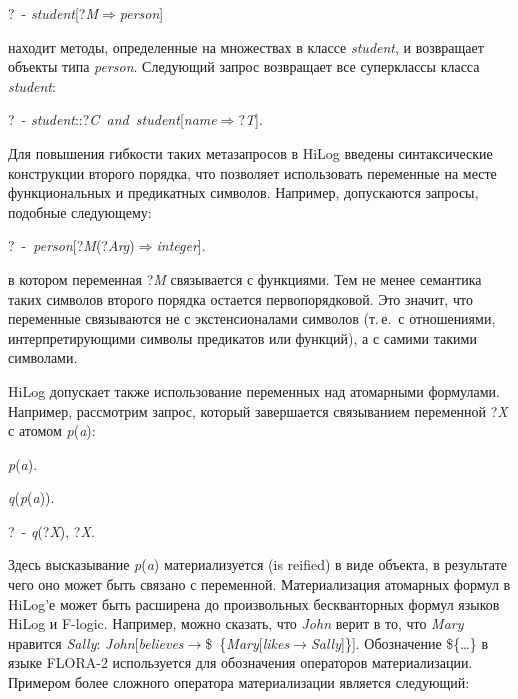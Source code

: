 \begin{multicols}{2}
\begin{center}
?~-  \textit{student}[?\textit{M}\;$\Rightarrow$\;\textit{person}]
\end{center}

\noindent
находит методы, определенные на множествах в классе \textit{student}, и возвращает 
объекты типа \textit{person}. Следующий запрос возвращает все суперклассы класса 
\textit{student}:

\begin{center}
?~-  \textit{student}::?\textit{C\ and\ student}[\textit{name}\;$\Rightarrow$\;?\textit{T}].
\end{center}


Для повышения гибкости таких метазапросов в HiLog введены синтаксические конструкции 
второго порядка, что позволяет использовать переменные на месте функциональных и 
предикатных символов. Например, допускаются запросы, подобные следующему:

\begin{center}
?~-\ \textit{person}[?\textit{M}(?\textit{Arg})\;$\Rightarrow$\;\textit{integer}].
\end{center}

\noindent
в котором переменная ?\textit{M} связывается с функциями. Тем не менее семантика таких 
символов второго порядка остается первопорядковой. Это значит, что переменные 
связываются не с экстенсионалами символов (т.\,е.\ с отношениями, интерпретирующими 
символы предикатов или функций), а с самими такими символами.

HiLog допускает также использование переменных над атомарными формулами. Например, 
рассмотрим запрос, который завершается связыванием переменной ?\textit{X} с атомом \textit{p}(\textit{a}):

\smallskip

\textit{p}(\textit{a}).

\textit{q}(\textit{p}(\textit{a})).

?~-  \textit{q}(?\textit{X}), ?\textit{X}.

\smallskip

\noindent
Здесь высказывание \textit{p}(\textit{a}) материализуется (is \mbox{reified}) в виде объекта, 
в результате чего 
оно может быть связано с переменной. Материализация атомарных формул в HiLog'е может 
быть расширена до произвольных бескванторных формул языков HiLog и F-logic. Например, 
можно сказать, что \textit{John} верит в то, что \textit{Mary} нравится \textit{Sally}:
\textit{John}[\textit{believes}\;$\rightarrow$\;\$~\{\textit{Mary}[\textit{likes}\;$\rightarrow$\;\textit{Sally}]\}].
Обозначение \$\{\ldots\} в языке FLORA-2 используется для обозначения операторов 
материализации. Примером более сложного оператора материализации является 
следующий:


\end{multicols}
